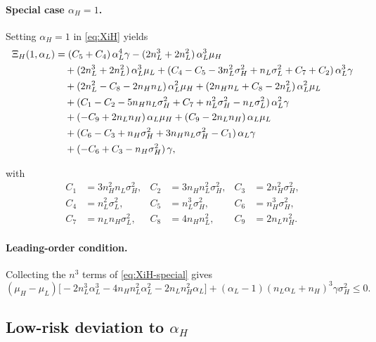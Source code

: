\documentclass[a4paper,12pt]{article}
\theoremstyle{definition}
\theoremstyle{remark}
\newcommand{\1}{\mathbf{1}}
\begin{document}
\paragraph{Special case $\alpha_H=1$.}
Setting $\alpha_H = 1$ in \eqref{eq:XiH} yields
\begin{align}
    \Xi_H(1,\alpha_L)
    &= (C_5 + C_4)\,\alpha_L^4 \gamma - (2 n_L^3 + 2 n_L^2)\,\alpha_L^3 \mu_H \notag\\
    &\quad + (2 n_L^3 + 2 n_L^2)\,\alpha_L^3 \mu_L + (C_4 - C_5 - 3 n_L^2 \sigma_H^2 + n_L \sigma_L^2 + C_7 + C_2)\,\alpha_L^3 \gamma \notag\\
    &\quad + (2 n_L^2 - C_8 - 2 n_H n_L)\,\alpha_L^2 \mu_H + (2 n_H n_L + C_8 - 2 n_L^2)\,\alpha_L^2 \mu_L \notag\\
    &\quad + (C_1 - C_2 - 5 n_H n_L \sigma_H^2 + C_7 + n_L^2 \sigma_H^2 - n_L \sigma_L^2)\,\alpha_L^2 \gamma \notag\\
    &\quad + (- C_9 + 2 n_L n_H)\,\alpha_L \mu_H + (C_9 - 2 n_L n_H)\,\alpha_L \mu_L \notag\\
    &\quad + (C_6 - C_3 + n_H \sigma_H^2 + 3 n_H n_L \sigma_H^2 - C_1)\,\alpha_L \gamma \notag\\
    &\quad + (- C_6 + C_3 - n_H \sigma_H^2)\,\gamma, \label{eq:XiH-special}
\end{align}

with
\begin{align*}
    C_1 &= 3 n_H^2 n_L \sigma_H^2, &
    C_2 &= 3 n_H n_L^2 \sigma_H^2, &
    C_3 &= 2 n_H^2 \sigma_H^2, \\
    C_4 &= n_L^2 \sigma_L^2, &
    C_5 &= n_L^3 \sigma_H^2, &
    C_6 &= n_H^3 \sigma_H^2, \\
    C_7 &= n_L n_H \sigma_L^2, &
    C_8 &= 4 n_H n_L^2, &
    C_9 &= 2 n_L n_H^2.
\end{align*}

\paragraph{Leading-order condition.}
Collecting the $n^3$ terms of \eqref{eq:XiH-special} gives
\begin{equation}\label{eq:IC-H-leading}
    (\mu_H - \mu_L)\Big[-2 n_L^3 \alpha_L^3 - 4 n_H n_L^2 \alpha_L^2 - 2 n_L n_H^2 \alpha_L \Big]
    + (\alpha_L - 1)(n_L \alpha_L + n_H)^3 \gamma \sigma_H^2 \le 0 .
\end{equation}

\subsection{Low-risk deviation to $\alpha_H$}\label{app:IC-L}
\end{document}
